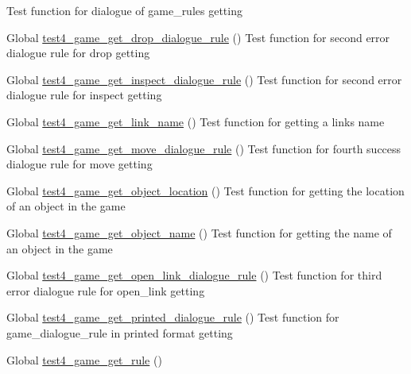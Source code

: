 \begin{DoxyRefList}
%
Test function for dialogue of game\+\_\+rules getting  
\item[Global \mbox{\hyperlink{game__test_8c_a58834b4920d40bd4bde861426faff29c}{test4\+\_\+game\+\_\+get\+\_\+drop\+\_\+dialogue\+\_\+rule}} ()]\label{test__test000347}%
%
Test function for second error dialogue rule for drop getting  
\item[Global \mbox{\hyperlink{game__test_8c_a5124cc9c334191253e2fa15519f724f1}{test4\+\_\+game\+\_\+get\+\_\+inspect\+\_\+dialogue\+\_\+rule}} ()]\label{test__test000354}%
%
Test function for second error dialogue rule for inspect getting  
\item[Global \mbox{\hyperlink{game__test_8c_a42a9ac112d40d8ed2b5646aa518e45a2}{test4\+\_\+game\+\_\+get\+\_\+link\+\_\+name}} ()]\label{test__test000242}%
%
Test function for getting a link\textquotesingle{}s name\textquotesingle{}  
\item[Global \mbox{\hyperlink{game__test_8c_a4e2466ff886a4470ca010845ac1c1f34}{test4\+\_\+game\+\_\+get\+\_\+move\+\_\+dialogue\+\_\+rule}} ()]\label{test__test000327}%
%
Test function for fourth success dialogue rule for move getting  
\item[Global \mbox{\hyperlink{game__test_8c_aff82cbdb4df2dc9963b68b34b966f538}{test4\+\_\+game\+\_\+get\+\_\+object\+\_\+location}} ()]\label{test__test000205}%
%
Test function for getting the location of an object in the game  
\item[Global \mbox{\hyperlink{game__test_8c_a94c8d1d1a0036ab57846afc137e33fee}{test4\+\_\+game\+\_\+get\+\_\+object\+\_\+name}} ()]\label{test__test000201}%
%
Test function for getting the name of an object in the game  
\item[Global \mbox{\hyperlink{game__test_8c_afc9723fbb143c4cfbf97f93af91bbc3d}{test4\+\_\+game\+\_\+get\+\_\+open\+\_\+link\+\_\+dialogue\+\_\+rule}} ()]\label{test__test000370}%
%
Test function for third error dialogue rule for open\+\_\+link getting  
\item[Global \mbox{\hyperlink{game__test_8c_a11a5d45d1dcd82c50ed16949535fc165}{test4\+\_\+game\+\_\+get\+\_\+printed\+\_\+dialogue\+\_\+rule}} ()]\label{test__test000314}%
%
Test function for game\+\_\+dialogue\+\_\+rule in printed format getting  
\item[Global \mbox{\hyperlink{game__test_8c_a15b0f9cd9542c8da02c2d31b46bd9720}{test4\+\_\+game\+\_\+get\+\_\+rule}} ()]\label{test__test000402}%

\end{DoxyRefList}

